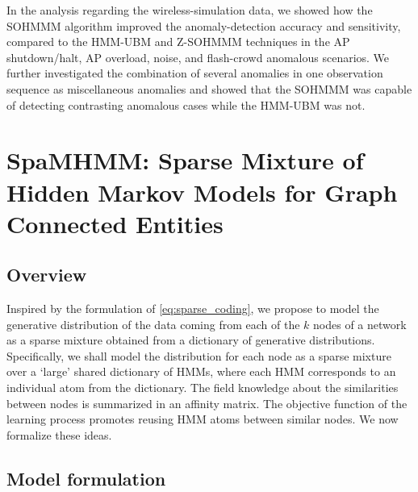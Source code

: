In the analysis regarding the wireless-simulation data, we showed how the SOHMMM algorithm improved the anomaly-detection accuracy and sensitivity, compared to the HMM-UBM and Z-SOHMMM techniques in the AP shutdown/halt, AP overload, noise, and flash-crowd anomalous scenarios. We further investigated the combination of several anomalies in one observation sequence as miscellaneous anomalies and showed that the SOHMMM was capable of detecting contrasting anomalous cases while the HMM-UBM was not. 

\section{SpaMHMM: Sparse Mixture of Hidden Markov Models for Graph Connected Entities}
\label{sec:spamhmm}

\subsection{Overview}

Inspired by the formulation of \eqref{eq:sparse_coding}, we propose to model the generative distribution of the data coming from each of the $k$ nodes of a network as a sparse mixture obtained from a dictionary of generative distributions. Specifically, we shall model the distribution for each node as a sparse mixture over a `large' shared dictionary of HMMs, where each HMM corresponds to an individual atom from the dictionary.
The field knowledge about the similarities between nodes is summarized in an affinity matrix. The objective function of the learning process promotes reusing HMM atoms between similar nodes.
We now formalize these ideas.

\subsection{Model formulation}
